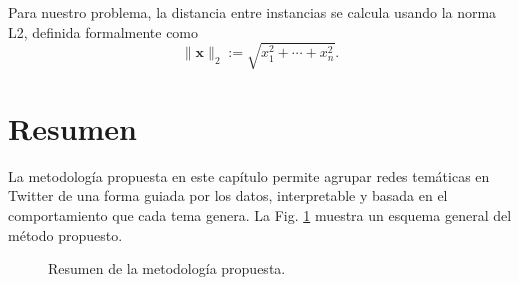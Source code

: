 Para nuestro problema, la distancia entre instancias se calcula usando la norma L2, definida formalmente como
$${\displaystyle \|{\boldsymbol {x}}\|_{2}:={\sqrt {x_{1}^{2}+\cdots +x_{n}^{2}}}.}$$

\section{Resumen}
La metodología propuesta en este capítulo permite agrupar redes temáticas en Twitter de una forma guiada por los datos, interpretable y basada en el comportamiento que cada tema genera. La Fig. \ref{fig:masterplan} muestra un esquema general del método propuesto. 
 
\begin{figure}[htbp]
   \centering
   
    \caption{Resumen de la metodología propuesta.}
    \label{fig:masterplan}
\end{figure}




